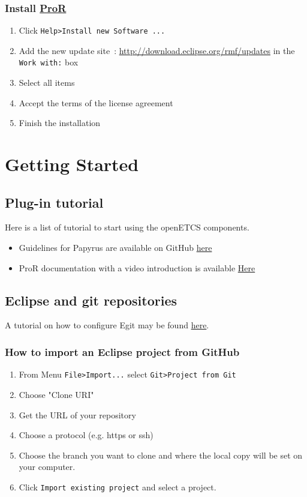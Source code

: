 \documentclass{template/openetcs_report}
\begin{document}
\subsection{Install \href{http://www.eclipse.org/rmf/pror/}{ProR}}
\begin{enumerate}
\item Click \verb+Help>Install new Software ...+
\item Add the new update site~:
\url{http://download.eclipse.org/rmf/updates} 
in the \verb+Work with:+ box
\item Select all items
\item Accept the terms of the license agreement
\item Finish the installation
\end{enumerate}

\chapter{Getting Started}

\section{Plug-in tutorial}
Here is a list of tutorial to start using the openETCS components.

\begin{itemize}
\item Guidelines for Papyrus are available on GitHub \href{https://github.com/openETCS/model-evaluation/tree/master/model/Papyrus-CEA-All4tec/papyrus_guidelines}{here}
\item  ProR documentation with a video introduction is available  \href{http://www.eclipse.org/rmf/pror/}{Here}
\end{itemize}

\section{Eclipse and  git repositories}
A tutorial on how to configure Egit may be found  \href{http://eclipsesource.com/blogs/tutorials/egit-tutorial/}{here}.
\subsection{How to import an Eclipse project from GitHub}
\begin{enumerate}
\item From Menu 
\verb+File>Import...+ select \verb+Git>Project from Git+
\item Choose "Clone URI"
\item Get the URL of your repository
\item Choose a protocol (e.g. https or ssh)
\item Choose the branch you want to clone and where the local copy
  will be set on your computer.
\item Click \verb+Import existing project+ and  select a project.

\end{enumerate}

\end{document}

